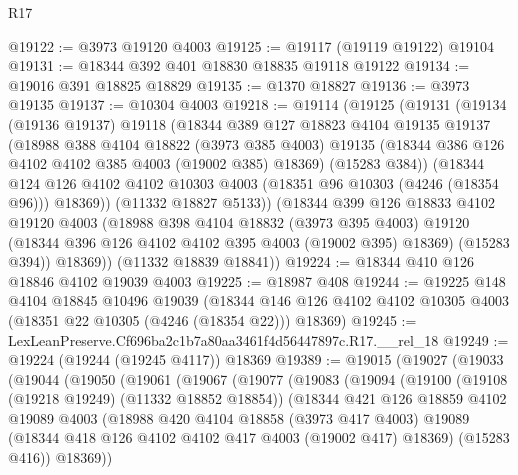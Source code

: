 \begin{lexlean}{R17}
\begin{coremodule}
@19122 := @3973 @19120 @4003
@19125 := @19117 (@19119 @19122) @19104
@19131 := @18344 @392 @401 @18830 @18835 @19118 @19122
@19134 := @19016 @391 @18825 @18829
@19135 := @1370 @18827
@19136 := @3973 @19135
@19137 := @10304 @4003
@19218 := @19114
    (@19125
      (@19131
        (@19134
          (@19136 @19137)
          @19118
          (@18344
            @389
            @127
            @18823
            @4104
            @19135
            @19137
            (@18988
              @388
              @4104
              @18822
              (@3973 @385 @4003)
              @19135
              (@18344 @386 @126 @4102 @4102 @385 @4003 (@19002 @385) @18369)
              (@15283 @384))
            (@18344
              @124
              @126
              @4102
              @4102
              @10303
              @4003
              (@18351 @96 @10303 (@4246 (@18354 @96)))
              @18369))
          (@11332 @18827 @5133))
        (@18344
          @399
          @126
          @18833
          @4102
          @19120
          @4003
          (@18988
            @398
            @4104
            @18832
            (@3973 @395 @4003)
            @19120
            (@18344 @396 @126 @4102 @4102 @395 @4003 (@19002 @395) @18369)
            (@15283 @394))
          @18369))
      (@11332 @18839 @18841))
@19224 := @18344 @410 @126 @18846 @4102 @19039 @4003
@19225 := @18987 @408
@19244 := @19225
    @148
    @4104
    @18845
    @10496
    @19039
    (@18344 @146 @126 @4102 @4102 @10305 @4003 (@18351 @22 @10305 (@4246 (@18354 @22))) @18369)
@19245 := LexLeanPreserve.Cf696ba2c1b7a80aa3461f4d56447897c.R17.__rel_18
@19249 := @19224 (@19244 (@19245 @4117)) @18369
@19389 := @19015
    (@19027
      (@19033
        (@19044
          (@19050
            (@19061
              (@19067
                (@19077
                  (@19083
                    (@19094
                      (@19100
                        (@19108 (@19218 @19249) (@11332 @18852 @18854))
                        (@18344
                          @421
                          @126
                          @18859
                          @4102
                          @19089
                          @4003
                          (@18988
                            @420
                            @4104
                            @18858
                            (@3973 @417 @4003)
                            @19089
                            (@18344 @418 @126 @4102 @4102 @417 @4003 (@19002 @417) @18369)
                            (@15283 @416))
                          @18369))

\end{coremodule}
\end{lexlean}
